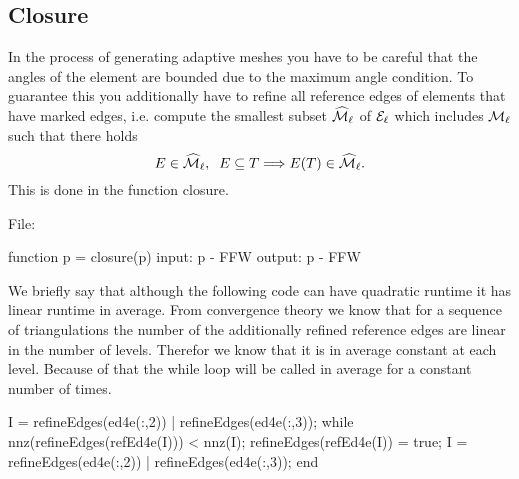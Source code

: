 
\subsection{Closure}
In the process of generating adaptive meshes you have to
be careful that the angles of the element are bounded 
due to the maximum angle condition. To guarantee this you
additionally have to refine all reference edges of elements
that have marked edges, i.e. compute the smallest subset $\widehat{\mathcal{M}}_\ell$ of $\mathcal{E}_\ell$ which includes $\mathcal{M}_\ell$ such that
there holds 
\begin{equation*}
 E\in \widehat{\mathcal{M}}_\ell, \;\; E\subseteq T \Longrightarrow   E(T)\in \widehat{\mathcal{M}}_\ell.
\end{equation*} 
This is done in the function closure.

\medskip
\noindent
File: 
\begin{pcode}
function p = closure(p) 
input:   p - FFW
output:  p - FFW
\end{pcode}

\noindent
We briefly say that although the following code
can have quadratic runtime it has linear runtime
in average. From convergence theory we know that for
a sequence of triangulations the number of the additionally refined 
reference edges are linear in the number of levels.
Therefor we know that it is in average constant at each
level. Because of that the while loop will be called
in average for a constant number of times. 
\begin{pcode}
I =  refineEdges(ed4e(:,2)) | refineEdges(ed4e(:,3));
while nnz(refineEdges(refEd4e(I))) < nnz(I);
   refineEdges(refEd4e(I)) = true;
   I =  refineEdges(ed4e(:,2)) | refineEdges(ed4e(:,3));
end
\end{pcode}

